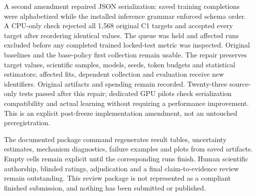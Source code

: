 \documentclass{svproc}
\begin{document}
A second amendment repaired JSON serialization: saved training completions were
alphabetized while the installed inference grammar enforced schema order. A
CPU-only check rejected all 1,568 original C1 targets and accepted every target
after reordering identical values. The queue was held and affected runs excluded
before any completed trained locked-test metric was inspected. Original baselines
and the base-policy first collection remain usable. The repair preserves target
values, scientific samples, models, seeds, token budgets and statistical estimators;
affected fits, dependent collection and evaluation receive new identifiers.
Original artifacts and spending remain recorded. Twenty-three source-only tests
passed after this repair; dedicated GPU pilots check serialization compatibility
and actual learning without requiring a performance improvement. This is an
explicit post-freeze implementation amendment, not an untouched preregistration.

The documented package command regenerates result tables, uncertainty estimates,
mechanism diagnostics, failure examples and plots from saved artifacts. Empty
cells remain explicit until the corresponding runs finish. Human scientific
authorship, blinded ratings, adjudication and a final claim-to-evidence review
remain outstanding. This review package is not represented as a compliant finished
submission, and nothing has been submitted or published.



\end{document}

